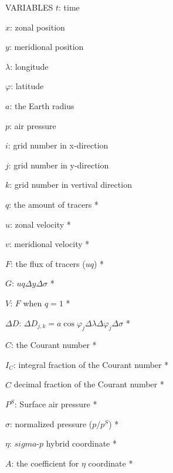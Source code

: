 \documentclass{article}
\begin{document}
VARIABLES
$t$: time

$x$: zonal position                                                        

$y$: meridional position                                                   

$\lambda$: longitude             

$\varphi$: latitude                                                      

$a$: the Earth radius                                                       

$p$: air pressure                                                        

$i$: grid number in x-direction                                            

$j$: grid number in y-direction                                            

$k$: grid number in vertival direction                                      

$q$: the amount of tracers *                                               

$u$: zonal velocity *                                                      

$v$: meridional velocity *                                                  

$F$: the flux of tracers ($uq$) *                                           

$G$: $uq\Delta y \Delta \sigma$ *                                           

$V$: $F$ when $q=1$ *

$\Delta D$: $\Delta D_{j,k}=a \cos \varphi_{j}\Delta \lambda \Delta \varphi_{j} \Delta \sigma$ *                               

$C$: the Courant number *                                             

$I_{C}$: integral fraction of the Courant number *                          

$\hat{C}$ decimal fraction of the Courant number *                         

$P^{S}$: Surface air pressure *                                         

$\sigma$: normalized pressure ($p/p^{S}$) *                               

$\eta$: $sigma$-$p$ hybrid coordinate *                              

$A$: the coefficient for $\eta$ coordinate *                               
\end{document}
